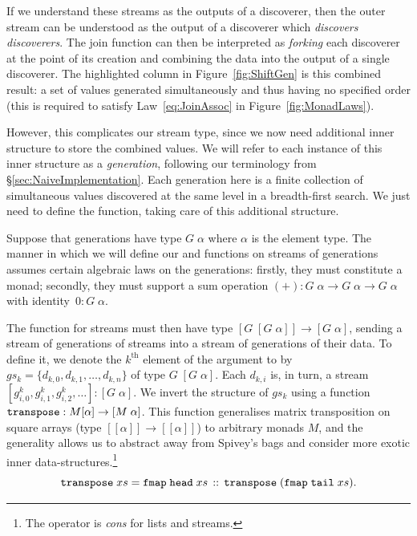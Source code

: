 If we understand these streams as the outputs of a discoverer, then the outer stream can be understood as the output of a discoverer which \emph{discovers discoverers}. The join function can then be interpreted as \emph{forking} each discoverer at the point of its creation and combining the data into the output of a single discoverer. The highlighted column in Figure~\ref{fig:ShiftGen} is this combined result: a set of values generated simultaneously and thus having no specified order (this is required to satisfy Law~\ref{eq:JoinAssoc} in Figure~\ref{fig:MonadLaws}).

However, this complicates our stream type, since we now need additional inner structure to store the combined values. We will refer to each instance of this inner structure as a \emph{generation}, following our terminology from \S\ref{sec:NaiveImplementation}. Each generation here is a finite collection of simultaneous values discovered at the same level in a breadth-first search. We just need to define the  function, taking care of this additional structure.

Suppose that generations have type $G\;\alpha$ where $\alpha$ is the element type. The manner in which we will define our  and  functions on streams of generations assumes certain algebraic laws on the generations: firstly, they must constitute a monad; secondly, they must support a sum operation \mbox{$(+):G\;\alpha\rightarrow G\;\alpha\rightarrow G\;\alpha$} with identity~$0:G\;\alpha$. 

The  function for streams must then have type $[G\;[G\;\alpha]] \rightarrow [G\;\alpha]$, sending a stream of generations of streams into a stream of generations of their data. To define it, we denote the $k^{\text{th}}$ element of the argument to  by $gs_k = \{d_{k,0}, d_{k,1}, \ldots, d_{k,n}\}$ of type $G\;[G\;\alpha]$. Each $d_{k,i}$ is, in turn, a stream $[g^k_{i,0}, g^k_{i,1}, g^k_{i,2}, \ldots] : [G\;\alpha]$. We invert the structure of $gs_k$ using a function $\texttt{transpose}  : M[\alpha]\rightarrow [M\;\alpha]$. This function generalises matrix transposition on square arrays (type $[[\alpha]]\rightarrow[[\alpha]]$) to arbitrary monads $M$, and the generality allows us to abstract away from Spivey's bags and consider more exotic inner data-structures.\footnote{The operator \code{::} is \emph{cons} for lists and streams.}
\begin{displaymath}
\texttt{transpose}\;xs = \texttt{fmap}\;\texttt{head}\;xs\,::\,\texttt{transpose}\; (\texttt{fmap}\;\texttt{tail}\;xs).
\end{displaymath}

